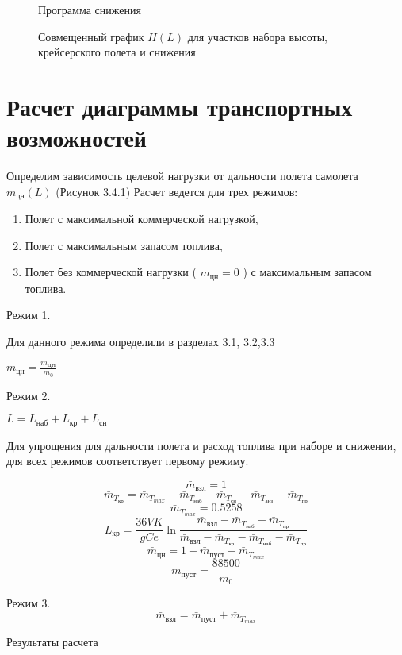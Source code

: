 \begin{figure}[H]
\centering
\resizebox{.79\linewidth}{!}{}
\caption{Программа снижения}
\label{fig:H_M_des}
\end{figure}

\begin{figure}[H]
\centering
\resizebox{.79\linewidth}{!}{}
\caption{Совмещенный график $H(L)$ для участков набора высоты, крейсерского полета и снижения}
\label{fig:H_L}
\end{figure}

\section{Расчет диаграммы транспортных возможностей}
Определим зависимость целевой нагрузки от дальности полета самолета
$m_{цн}(L)$ (Рисунок 3.4.1)
Расчет ведется для трех режимов:
\begin{enumerate}
    \item Полет с максимальной коммерческой нагрузкой,
    \item Полет с максимальным запасом топлива,
    \item Полет без коммерческой нагрузки ( $m_{цн}=0$ ) с максимальным запасом топлива.
\end{enumerate}

Режим 1.

Для данного режима определили в разделах 3.1, 3.2,3.3

$m_{цн} = \frac{m_{ЦН}}{m_0}$

Режим 2.

$ L = L_{наб} + L_{кр} + L_{сн} $

Для упрощения для дальности полета и расход топлива при наборе и снижении,
для всех режимов соответствует первому режиму.

\[
    \bar{m}_{взл} = 1
\]
\[
    \bar{m}_{T_{кр}} = \bar{m}_{T_{max}}- \bar{m}_{T_{наб}} -
\bar{m}_{T_{сн}} - \bar{m}_{T_{анз}} - \bar{m}_{T_{пр}} 
\]
\[
\bar{m}_{T_{max}} = 0.5258
\]
\[
    L_{кр} = \frac{36 V K}{gCe} \ln{\frac{\bar{m}_{взл} - \bar{m}_{T_{наб}} - \bar{m}_{T_{пр}}}{\bar{m}_{взл}-\bar{m}_{T_{кр}}-\bar{m}_{T_{наб}} - \bar{m}_{T_{пр}}}}
\]
\[
    \bar{m}_{цн} = 1 - \bar{m}_{пуст} - \bar{m}_{T_{max}}
\]
\[
    \bar{m}_{пуст} = \frac{88500}{m_0}
\]

Режим 3.
\[
    \bar{m}_{взл} = \bar{m}_{пуст} + \bar{m}_{T_{max}}
\]


\begin{table}[H]
    \centering
    \caption{Результаты расчета}
    \label{tab:cargo_load}
    
\end{table}

